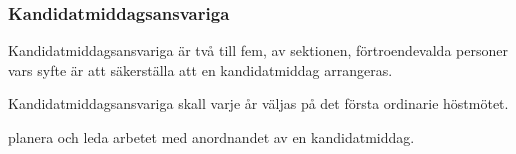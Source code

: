 \subsubsection{Kandidatmiddagsansvariga}
Kandidatmiddagsansvariga är två till fem, av sektionen, förtroendevalda personer vars syfte är att säkerställa att en kandidatmiddag arrangeras.

Kandidatmiddagsansvariga skall varje år väljas på det första ordinarie höstmötet.

\begin{att}
  \item planera och leda arbetet med anordnandet av en kandidatmiddag.
\end{att}
